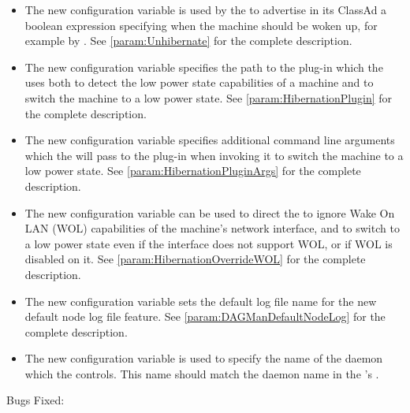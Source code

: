 \begin{itemize}
\item The new configuration variable  is used by
the  to advertise in its ClassAd a boolean expression
specifying when the machine should be woken up, 
for example by .
See \ref{param:Unhibernate} for the complete description.

\item The new configuration variable  specifies the
  path to the plug-in which the  uses both to detect
  the low power state capabilities of a machine and to switch the
  machine to a low power state.
  See \ref{param:HibernationPlugin} for the complete description.

\item The new configuration variable 
  specifies additional command line arguments which the
   will pass to the plug-in when invoking it to
  switch the machine to a low power state.
  See \ref{param:HibernationPluginArgs} for the complete description.

\item The new configuration variable  can be
  used to direct the  to ignore Wake On LAN (WOL)
  capabilities of the machine's network interface, and to switch to a
  low power state even if the interface does not support WOL, or if
  WOL is disabled on it.
  See \ref{param:HibernationOverrideWOL} for the complete description.

\item The new configuration variable  sets
the default log file name for the new 
default node log file feature.
See \ref{param:DAGManDefaultNodeLog}
for the complete description.

\item The new configuration variable  is used
  to specify the name of the daemon which the  controls.
  This name should match the daemon name in the 's
  .

\end{itemize}

\noindent Bugs Fixed:

